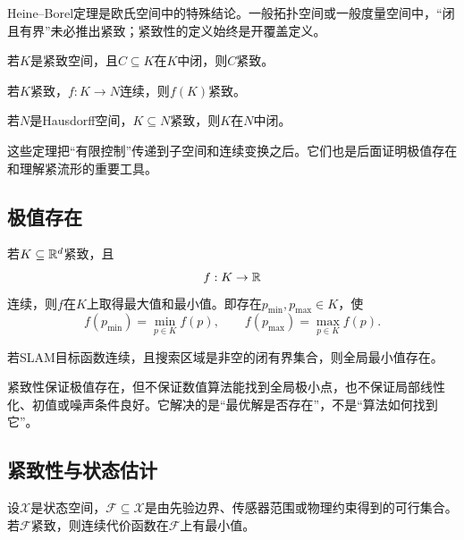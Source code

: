 \begin{remark}[定理的适用范围]
Heine--Borel定理是欧氏空间中的特殊结论。一般拓扑空间或一般度量空间中，“闭且有界”未必推出紧致；紧致性的定义始终是开覆盖定义。
\end{remark}

\begin{theorem}[闭子集紧致]
若$K$是紧致空间，且$C\subseteq K$在$K$中闭，则$C$紧致。
\end{theorem}

\begin{theorem}[连续像紧致]
若$K$紧致，$f:K\to N$连续，则$f(K)$紧致。
\end{theorem}

\begin{corollary}[Hausdorff空间中的紧子集闭]
若$N$是Hausdorff空间，$K\subseteq N$紧致，则$K$在$N$中闭。
\end{corollary}

这些定理把“有限控制”传递到子空间和连续变换之后。它们也是后面证明极值存在和理解紧流形的重要工具。

\subsection{极值存在}

\begin{theorem}[Weierstrass定理]
若$K\subseteq\mathbb{R}^d$紧致，且
\[
    f:K\to\mathbb{R}
\]
连续，则$f$在$K$上取得最大值和最小值。即存在$p_{\min},p_{\max}\in K$，使
\[
    f(p_{\min})
    =
    \min_{p\in K}f(p),
    \qquad
    f(p_{\max})
    =
    \max_{p\in K}f(p).
\]
\end{theorem}

\begin{corollary}[有界搜索区域]
若SLAM目标函数连续，且搜索区域是非空的闭有界集合，则全局最小值存在。
\end{corollary}

\begin{remark}[存在性不等于可计算性]
紧致性保证极值存在，但不保证数值算法能找到全局极小点，也不保证局部线性化、初值或噪声条件良好。它解决的是“最优解是否存在”，不是“算法如何找到它”。
\end{remark}

\subsection{紧致性与状态估计}

设$\mathcal X$是状态空间，$\mathcal F\subseteq\mathcal X$是由先验边界、传感器范围或物理约束得到的可行集合。若$\mathcal F$紧致，则连续代价函数在$\mathcal F$上有最小值。

